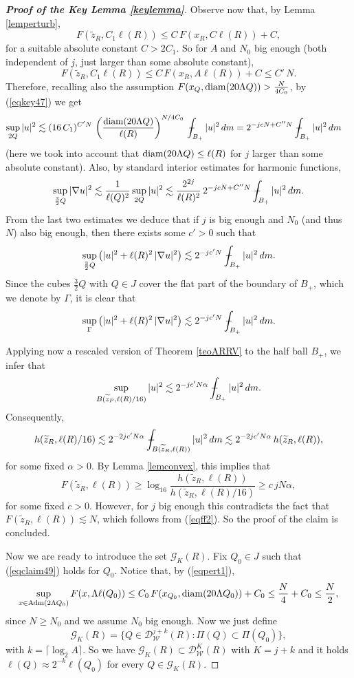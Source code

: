 \documentclass[11pt]{amsart}
\newcommand{\DD}{{\mathcal D}}
\newcommand{\WW}{{\mathcal W}}
\newcommand{\GZ}{{\mathcal G}}
\newcommand{\diam}{{\rm diam}}
\newcommand{\rf}[1]{{(\ref{#1})}}
\newcommand{\vv}{{\vspace{2mm}}}
\newcommand{\wt}[1]{{\widetilde{#1}}}
\def\Xint#1{\mathchoice
{\XXint\displaystyle\textstyle{#1}}%
{\XXint\textstyle\scriptstyle{#1}}%
{\XXint\scriptstyle\scriptscriptstyle{#1}}%
{\XXint\scriptscriptstyle\scriptscriptstyle{#1}}%
\!\int}
\def\XXint#1#2#3{{\setbox0=\hbox{$#1{#2#3}{\int}$ }
\vcenter{\hbox{$#2#3$ }}\kern-.58\wd0}}
\def\avint{\;\Xint-}
\theoremstyle{definition}
\theoremstyle{remark}
\numberwithin{equation}{section}
\begin{document}
\begin{proof}[\bf Proof of the Key Lemma \ref{keylemma}]
Observe now that, by Lemma \ref{lemperturb}, 
$$F(\wt z_R,C_1\ell(R)) \leq C\,F(x_R,C\ell(R)) + C,$$
for a suitable absolute constant $C>2C_1$. So for $A$ and $N_0$ big enough (both independent of $j$, just larger than some absolute constant),
\begin{equation}\label{eqff2}
F(\wt z_R,C_1\ell(R)) \leq C\,F(x_R,A\ell(R)) + C\leq C'\,N.
\end{equation}
Therefore, recalling also the assumption $F(x_Q,\diam(20\Lambda Q))> \frac N{4C_0}$, by \rf{eqkey47} we get
\begin{align*}
\sup_{2Q}|u|^2 & \lesssim (16\, C_1)^{C'N}\,\left(\frac{\diam(20\Lambda Q)}{\ell(R)}\right)^{N/4C_0}
\avint_{B_+} |u|^2\,dm  = 2^{-jcN+C''N}\avint_{B_+} |u|^2\,dm
\end{align*}
(here we took into account that $\diam(20\Lambda Q)\leq\ell(R)$ for $j$ larger than some absolute constant).
Also, by standard interior estimates for harmonic functions,
$$\sup_{\frac32Q}|\nabla u|^2 \lesssim \frac1{\ell(Q)^2}\sup_{2Q}|u|^2 
\lesssim \frac{2^{2j}}{\ell(R)^2}\,2^{-jcN+C''N}\avint_{B_+} |u|^2\,dm.$$
From the last two estimates we deduce that if $j$ is big enough and $N_0$ (and thus $N$) also big enough, then there exists some $c'>0$
such that
$$\sup_{\frac32 Q}\big(|u|^2 + \ell(R)^2\,|\nabla u|^2\big) \lesssim 2^{-jc'N}\avint_{B_+} |u|^2\,dm.$$
Since the cubes $\frac32 Q$ with $Q\in J$ cover the flat part of the boundary of $B_+$, which we denote by $\Gamma$, it is clear that
$$\sup_{\Gamma}\big(|u|^2 + \ell(R)^2\,|\nabla u|^2\big) \lesssim 2^{-jc'N}\avint_{B_+} |u|^2\,dm.$$

Applying now a rescaled version of Theorem \ref{teoARRV} to the half ball $B_+$, we infer that
$$\sup_{B(\wt z_P,\ell(R)/16)} |u|^2 \lesssim 2^{-jc'N\alpha} \avint_{B_+} |u|^2\,dm.$$
Consequently,
$$h(\wt z_R,\ell(R)/16)\lesssim  2^{-2jc'N\alpha} \avint_{B(\wt z_R,\ell(R))} |u|^2\,dm
\lesssim 2^{-2jc'N\alpha} \,h(\wt z_R,\ell(R)),$$
for some fixed $\alpha>0$.
By Lemma \ref{lemconvex}, this implies that
$$F(\wt z_R,\ell(R))\geq \log_{16}\frac{h(\wt z_R,\ell(R))}{h(\wt z_R,\ell(R)/16)}\geq c\,jN\alpha,$$
for some fixed $c>0$.
However, for $j$ big enough this contradicts the fact that $F(\wt z_R,\ell(R))\lesssim N$, which follows from \rf{eqff2}. So the proof of the claim is concluded.

\vv
Now we are ready to introduce the set  $\GZ_K(R)$.
Fix $Q_0\in J$ such that \rf{eqclaim49} holds for $Q_0$. 
Notice that, by \rf{eqpert1}, 
\begin{equation}\label{eqadm45}
\sup_{x\in {\rm Adm}(2\Lambda Q_0)} F(x,\Lambda\ell(Q_0))\leq C_0\,F(x_{Q_0},\diam(20\Lambda Q_0)) + C_0
\leq \frac N4 + C_0\leq \frac N2,
\end{equation}
since $N\ge N_0$ and we assume $N_0$ big enough.
Now we just define
$$\GZ_K(R) = \{Q\in\DD_\WW^{j+k}(R):\Pi(Q)\subset \Pi(Q_0)\},$$
with $k=\lceil\log_2 A\rceil$. So we have $\GZ_K(R)\subset \DD_\WW^K(R)$ with $K=j+k$ and it holds
$\ell(Q)\approx 2^{-k}\ell(Q_0)$ for every $Q\in \GZ_K(R)$.


\end{proof}
\end{document}
